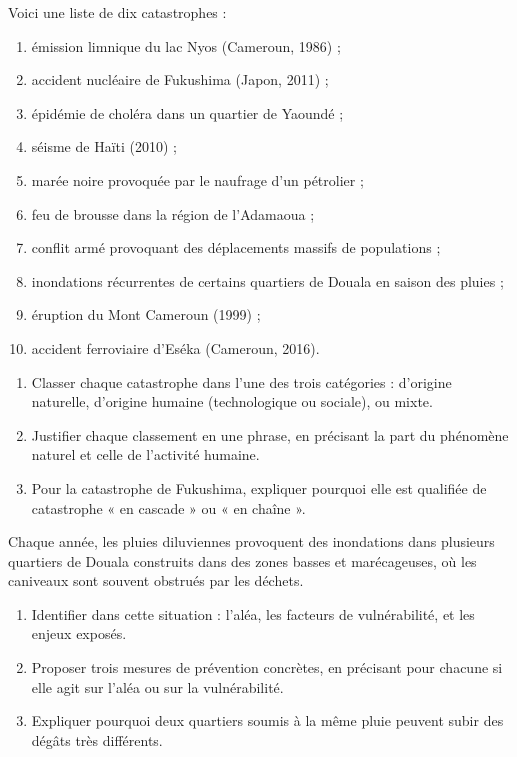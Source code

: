 \documentclass[11pt]{article}
\newcommand{\cle}[1]{{\popxbold\color{popdark}#1}}
\newcounter{popsec}
\newcounter{popsub}
\newcommand{\courssub}[1]{%
  \stepcounter{popsub}%
  \par\vspace{9pt}\noindent{\popxbold\fontsize{11.5}{13}\selectfont\color{popink}{\color{poporange}\thepopsec.\thepopsub}\hspace{6pt}#1}\par\nopagebreak\vspace{4pt}
}
\begin{document}
\courssub{Je m'entraîne}

\begin{exercice}
Voici une liste de dix catastrophes :
\begin{enumerate}
\item émission limnique du lac Nyos (Cameroun, 1986) ;
\item accident nucléaire de Fukushima (Japon, 2011) ;
\item épidémie de choléra dans un quartier de Yaoundé ;
\item séisme de Haïti (2010) ;
\item marée noire provoquée par le naufrage d'un pétrolier ;
\item feu de brousse dans la région de l'Adamaoua ;
\item conflit armé provoquant des déplacements massifs de populations ;
\item inondations récurrentes de certains quartiers de Douala en saison des pluies ;
\item éruption du Mont Cameroun (1999) ;
\item accident ferroviaire d'Eséka (Cameroun, 2016).
\end{enumerate}
\begin{enumerate}
\item Classer chaque catastrophe dans l'une des trois catégories : d'origine \cle{naturelle}, d'origine \cle{humaine} (technologique ou sociale), ou \cle{mixte}.
\item Justifier chaque classement en une phrase, en précisant la part du phénomène naturel et celle de l'activité humaine.
\item Pour la catastrophe de Fukushima, expliquer pourquoi elle est qualifiée de catastrophe « en cascade » ou « en chaîne ».
\end{enumerate}
\end{exercice}

\begin{exercice}
Chaque année, les pluies diluviennes provoquent des inondations dans plusieurs quartiers de Douala construits dans des zones basses et marécageuses, où les caniveaux sont souvent obstrués par les déchets.
\begin{enumerate}
\item Identifier dans cette situation : l'aléa, les facteurs de vulnérabilité, et les enjeux exposés.
\item Proposer trois mesures de prévention concrètes, en précisant pour chacune si elle agit sur l'aléa ou sur la vulnérabilité.
\item Expliquer pourquoi deux quartiers soumis à la même pluie peuvent subir des dégâts très différents.
\end{enumerate}
\end{exercice}
\end{document}
